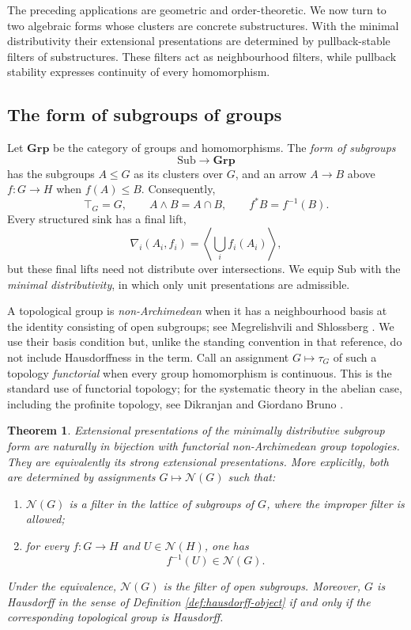 \documentclass[12pt,oneside,reqno]{amsart}
\newtheorem{theorem}{Theorem}[section]
\theoremstyle{definition}
\theoremstyle{remark}
\newcommand{\Sub}{\mathrm{Sub}}
\begin{document}
The preceding applications are geometric and order-theoretic.  We now
turn to two algebraic forms whose clusters are concrete substructures.
With the minimal distributivity their extensional presentations are
determined by pullback-stable filters of substructures.  These filters
act as neighbourhood filters, while pullback stability expresses
continuity of every homomorphism.

\subsection{The form of subgroups of groups}

Let \(\mathbf{Grp}\) be the category of groups and homomorphisms.  The
\emph{form of subgroups}
\[
                       \Sub\longrightarrow\mathbf{Grp}
\]
has the subgroups \(A\leqslant G\) as its clusters over \(G\), and an
arrow \(A\to B\) above \(f:G\to H\) when \(f(A)\leqslant B\).
Consequently,
\[
 \top_G=G,\qquad A\wedge B=A\cap B,\qquad
 f^*B=f^{-1}(B).
\]
Every structured sink has a final lift,
\[
       \nabla_i(A_i,f_i)=
       \left\langle\bigcup_i f_i(A_i)\right\rangle,
\]
but these final lifts need not distribute over intersections.  We equip
\(\Sub\) with the \emph{minimal distributivity}, in which only unit
presentations are admissible.

A topological group is \emph{non-Archimedean} when it has a
neighbourhood basis at the identity consisting of open subgroups; see
Megrelishvili and Shlossberg
\cite{MegrelishviliShlossberg}.  We use their basis condition but,
unlike the standing convention in that reference, do not include
Hausdorffness in the term.  Call an assignment
\(G\mapsto\tau_G\) of such a topology
\emph{functorial} when every group homomorphism is continuous.  This is
the standard use of functorial topology; for the systematic theory in
the abelian case, including the profinite topology, see Dikranjan and
Giordano Bruno \cite{DikranjanGiordanoBruno}.

\begin{theorem}\label{thm:subgroup-nonarchimedean}
Extensional presentations of the minimally distributive subgroup form
are naturally in bijection with functorial non-Archimedean group
topologies.  They are equivalently its strong extensional
presentations.  More
explicitly, both are determined by assignments
\(G\mapsto\mathcal N(G)\) such that:
\begin{enumerate}[label=\textup{(\roman*)}]
\item \(\mathcal N(G)\) is a filter in the lattice of subgroups of
\(G\), where the improper filter is allowed;
\item for every \(f:G\to H\) and \(U\in\mathcal N(H)\), one has
\begin{equation}\label{eq:subgroup-pullback-filter}
                         f^{-1}(U)\in\mathcal N(G).
\end{equation}
\end{enumerate}
Under the equivalence, \(\mathcal N(G)\) is the filter of open
subgroups.  Moreover, \(G\) is Hausdorff in the sense of Definition
\ref{def:hausdorff-object} if and only if the corresponding
topological group is Hausdorff.
\end{theorem}
\end{document}
